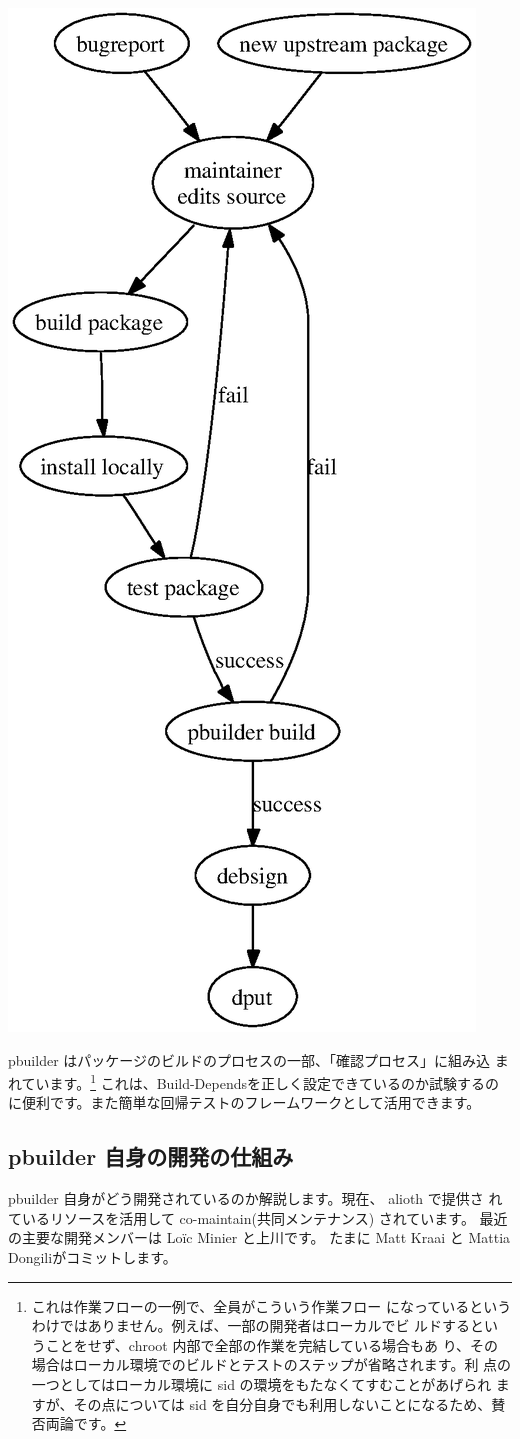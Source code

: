 \documentclass[mingoth,a4paper]{jsarticle}
\begin{document}
\begin{center}
 \includegraphics[width=0.5\hsize]{image200705/develcycle.eps}
\end{center}

pbuilder はパッケージのビルドのプロセスの一部、「確認プロセス」に組み込
まれています。\footnote{これは作業フローの一例で、全員がこういう作業フロー
になっているというわけではありません。例えば、一部の開発者はローカルでビ
ルドするということをせず、chroot 内部で全部の作業を完結している場合もあ
り、その場合はローカル環境でのビルドとテストのステップが省略されます。利
点の一つとしてはローカル環境に sid の環境をもたなくてすむことがあげられ
ますが、その点については sid を自分自身でも利用しないことになるため、賛
否両論です。} これは、Build-Dependsを正しく設定できているのか試験するの
に便利です。また簡単な回帰テストのフレームワークとして活用できます。

\subsection{pbuilder 自身の開発の仕組み}

pbuilder 自身がどう開発されているのか解説します。現在、 alioth で提供さ
れているリソースを活用して co-maintain(共同メンテナンス) されています。
最近の主要な開発メンバーは Lo\"ic Minier と上川です。
たまに Matt Kraai と Mattia Dongiliがコミットします。
\end{document}
